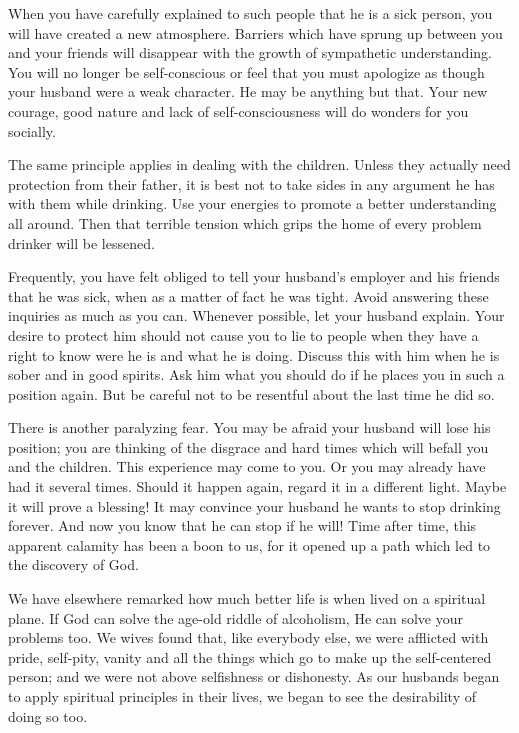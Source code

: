 \begin{biblechapter}
When you have carefully explained to such people that he is a sick person, you will have created a new atmosphere.  Barriers which have sprung up between you and your friends will disappear with the growth of sympathetic understanding.  You will no longer be self-conscious or feel that you must apologize as though your husband were a weak character.  He may be anything but that.  Your new courage, good nature and lack of self-consciousness will do wonders for you socially.

The same principle applies in dealing with the children.  Unless they actually need protection from their father, it is best not to take sides in any argument he has with them while drinking.  Use your energies to promote a better understanding all around.  Then that terrible tension which grips the home of every problem drinker will be lessened.

Frequently, you have felt obliged to tell your husband's employer and his friends that he was sick, when as a matter of fact he was tight.  Avoid answering these inquiries as much as you can.  Whenever possible, let your husband explain.  Your desire to protect him should not cause you to lie to people when they have a right to know were he is and what he is doing.  Discuss this with him when he is sober and in good spirits.  Ask him what you should do if he places you in such a position again.  But be careful not to be resentful about the last time he did so.

There is another paralyzing fear.  You may be afraid your husband will lose his position; you are thinking of the disgrace and hard times which will befall you and the children.  This experience may come to you.  Or you may already have had it several times.  Should it happen again, regard it in a different light.  Maybe it will prove a blessing!  It may convince your husband he wants to stop drinking forever.  And now you know that he can stop if he will!  Time after time, this apparent calamity has been a boon to us, for it opened up a path which led to the discovery of God.

We have elsewhere remarked how much better life is when lived on a spiritual plane.  If God can solve the age-old riddle of alcoholism, He can solve your problems too.  We wives found that, like everybody else, we were afflicted with pride, self-pity, vanity and all the things which go to make up the self-centered person; and we were not above selfishness or dishonesty.  As our husbands began to apply spiritual principles in their lives, we began to see the desirability of doing so too.


\end{biblechapter}
